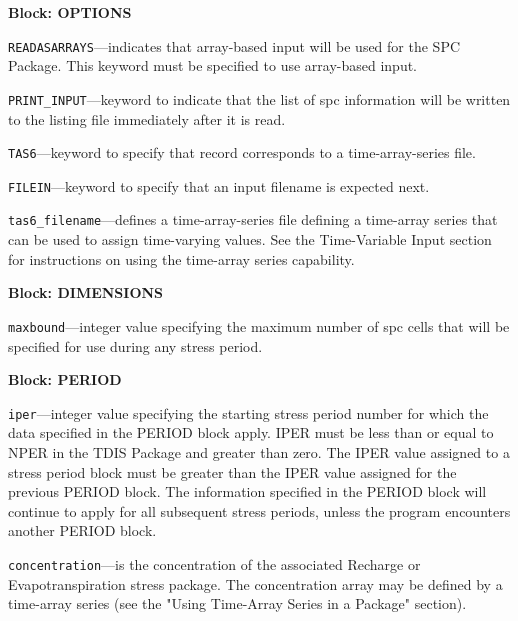 
\item \textbf{Block: OPTIONS}

\begin{description}
\item \texttt{READASARRAYS}---indicates that array-based input will be used for the SPC Package.  This keyword must be specified to use array-based input.

\item \texttt{PRINT\_INPUT}---keyword to indicate that the list of spc information will be written to the listing file immediately after it is read.

\item \texttt{TAS6}---keyword to specify that record corresponds to a time-array-series file.

\item \texttt{FILEIN}---keyword to specify that an input filename is expected next.

\item \texttt{tas6\_filename}---defines a time-array-series file defining a time-array series that can be used to assign time-varying values. See the Time-Variable Input section for instructions on using the time-array series capability.

\end{description}
\item \textbf{Block: DIMENSIONS}

\begin{description}
\item \texttt{maxbound}---integer value specifying the maximum number of spc cells that will be specified for use during any stress period.

\end{description}
\item \textbf{Block: PERIOD}

\begin{description}
\item \texttt{iper}---integer value specifying the starting stress period number for which the data specified in the PERIOD block apply.  IPER must be less than or equal to NPER in the TDIS Package and greater than zero.  The IPER value assigned to a stress period block must be greater than the IPER value assigned for the previous PERIOD block.  The information specified in the PERIOD block will continue to apply for all subsequent stress periods, unless the program encounters another PERIOD block.

\item \texttt{concentration}---is the concentration of the associated Recharge or Evapotranspiration stress package.  The concentration array may be defined by a time-array series (see the "Using Time-Array Series in a Package" section).

\end{description}

